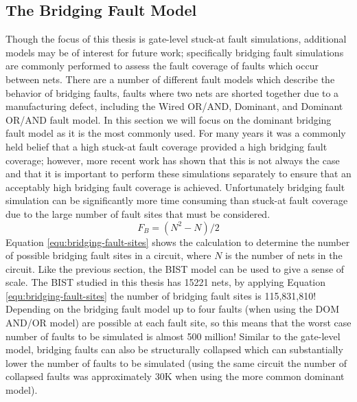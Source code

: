 \documentclass[12pt]{report}
\begin{document}
\subsection{The Bridging Fault Model}
\label{sct:bridgingfaults}
Though the focus of this thesis is gate-level stuck-at fault simulations, additional models may be of interest for future work; specifically bridging fault simulations are commonly performed to assess the fault coverage of faults which occur between nets.  There are a number of different fault models which describe the behavior of bridging faults, faults where two nets are shorted together due to a manufacturing defect, including the Wired OR/AND, Dominant, and Dominant OR/AND fault model\cite{stroud-bridging}.  In this section we will focus on the dominant bridging fault model as it is the most commonly used\cite{stroud}.  For many years it was a commonly held belief that a high stuck-at fault coverage provided a high bridging fault coverage; however, more recent work has shown that this is not always the case and that it is important to perform these simulations separately to ensure that an acceptably high bridging fault coverage is achieved\cite{stroud-bridging-physical}.  Unfortunately bridging fault simulation can be significantly more time consuming than stuck-at fault coverage due to the large number of fault sites that must be considered.
\begin{equation}
F_B = (N^2-N)/2
\label{equ:bridging-fault-sites}
\end{equation}
Equation \ref{equ:bridging-fault-sites} shows the calculation to determine the number of possible bridging fault sites in a circuit, where $N$ is the number of nets in the circuit\cite{stroud}.  Like the previous section, the BIST model can be used to give a sense of scale.  The BIST studied in this thesis has 15221 nets, by applying Equation \ref{equ:bridging-fault-sites} the number of bridging fault sites is 115,831,810!  Depending on the bridging fault model up to four faults (when using the DOM AND/OR model\cite{stroud-bridging}) are possible at each fault site, so this means that the worst case number of faults to be simulated is almost 500 million!  Similar to the gate-level model, bridging faults can also be structurally collapsed which can substantially lower the number of faults to be simulated (using the same circuit the number of collapsed faults was approximately 30K when using the more common dominant model).
\end{document}
